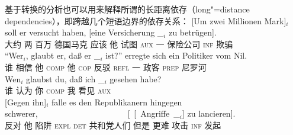 基于转换的分析也可以用来解释所谓的长距离依存（long"=distance dependencies），即跨越几个短语边界的依存关系：
\eal
\label{bsp-Fernabhaengigkeit}
\ex\label{bsp-um-zwei-millionen}
\gll {}[Um zwei Millionen Mark]$_i$ soll er versucht haben, [eine Versicherung \_$_i$ zu betrügen].\footnotemark\\
     {}\spacebr{}大约 两 百万 德国马克 应该 他 试图 \textsc{aux} \spacebr{}一 保险公司 {} \textsc{inf} 欺骗\\
\ex
\gll "`Wer$_i$, glaubt er, daß er \_$_i$ ist?"' erregte sich ein Politiker vom Nil.\footnotemark\\
     \spacebr{}谁 相信 他 \textsc{comp} 他 {} \textsc{cop} 反驳 \textsc{refl} 一 政客 \textsc{prep} 尼罗河\\
\ex\label{ex-wen-glaubst-du-dass}
\gll Wen$_i$ glaubst du, daß ich \_$_i$ gesehen habe?\footnotemark\\
     谁 认为 你 \textsc{comp} 我 {} 看见 \textsc{aux}\\
\ex 
\gll {}[Gegen ihn]$_i$ falle es den Republikanern hingegen schwerer,~~~~~~~~~~~~~~~~~~~~~ [~[~Angriffe~\_$_i$] zu lancieren].\footnotemark\\
	 {}\spacebr{}反对 他 陷阱 \textsc{expl} \textsc{det} 共和党人们 但是 更难 \hspaceThis{[~[~}攻击 \textsc{inf} 发起\\
